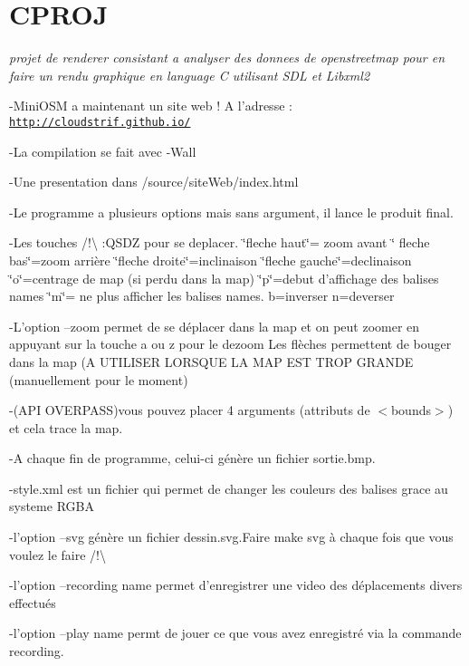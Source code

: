\section*{C\-P\-R\-O\-J}

{\itshape projet de renderer consistant a analyser des donnees de openstreetmap pour en faire un rendu graphique en language C utilisant S\-D\-L et Libxml2}



-\/\-Mini\-O\-S\-M a maintenant un site web ! A l'adresse \-: \href{http://cloudstrif.github.io/}{\tt http\-://cloudstrif.\-github.\-io/}

-\/\-La compilation se fait avec -\/\-Wall

-\/\-Une presentation dans /source/site\-Web/index.html

-\/\-Le programme a plusieurs options mais sans argument, il lance le produit final.

-\/\-Les touches /!\textbackslash{} \-:Q\-S\-D\-Z pour se deplacer. \char`\"{}fleche haut\char`\"{}= zoom avant \char`\"{} fleche bas\char`\"{}=zoom arrière \char`\"{}fleche droite\char`\"{}=inclinaison \char`\"{}fleche gauche\char`\"{}=declinaison \char`\"{}o\char`\"{}=centrage de map (si perdu dans la map) \char`\"{}p\char`\"{}=debut d'affichage des balises names \char`\"{}m\char`\"{}= ne plus afficher les balises names. b=inverser n=deverser

-\/\-L'option --zoom permet de se déplacer dans la map et on peut zoomer en appuyant sur la touche a ou z pour le dezoom Les flèches permettent de bouger dans la map (A U\-T\-I\-L\-I\-S\-E\-R L\-O\-R\-S\-Q\-U\-E L\-A M\-A\-P E\-S\-T T\-R\-O\-P G\-R\-A\-N\-D\-E (manuellement pour le moment)

-\/(A\-P\-I O\-V\-E\-R\-P\-A\-S\-S)vous pouvez placer 4 arguments (attributs de $<$bounds$>$) et cela trace la map.

-\/\-A chaque fin de programme, celui-\/ci génère un fichier sortie.\-bmp.

-\/style.\-xml est un fichier qui permet de changer les couleurs des balises grace au systeme R\-G\-B\-A

-\/l'option --svg génère un fichier dessin.\-svg.\-Faire make svg à chaque fois que vous voulez le faire /!\textbackslash{}

-\/l'option --recording name permet d'enregistrer une video des déplacements divers effectués

-\/l'option --play name permt de jouer ce que vous avez enregistré via la commande recording.

